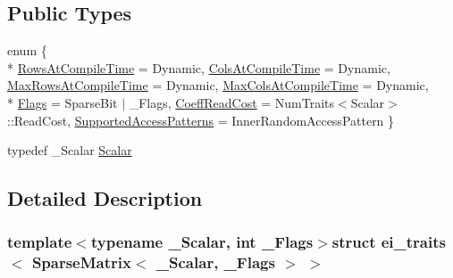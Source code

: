 \subsection*{Public Types}
\begin{DoxyCompactItemize}
\item 
enum \{ \\*
\hyperlink{structei__traits_3_01_sparse_matrix_3_01___scalar_00_01___flags_01_4_01_4_ae805feeaa4898eeaa7b75619a03eb834adb11bc6d779116f1db37ec0078e14438}{Rows\-At\-Compile\-Time} = Dynamic, 
\hyperlink{structei__traits_3_01_sparse_matrix_3_01___scalar_00_01___flags_01_4_01_4_ae805feeaa4898eeaa7b75619a03eb834a5827c0a32ae778a56548d9172a6d791a}{Cols\-At\-Compile\-Time} = Dynamic, 
\hyperlink{structei__traits_3_01_sparse_matrix_3_01___scalar_00_01___flags_01_4_01_4_ae805feeaa4898eeaa7b75619a03eb834a23a6296e7b701a57fd02faff414e0774}{Max\-Rows\-At\-Compile\-Time} = Dynamic, 
\hyperlink{structei__traits_3_01_sparse_matrix_3_01___scalar_00_01___flags_01_4_01_4_ae805feeaa4898eeaa7b75619a03eb834a509b461fd4512caa0453781a075430c2}{Max\-Cols\-At\-Compile\-Time} = Dynamic, 
\\*
\hyperlink{structei__traits_3_01_sparse_matrix_3_01___scalar_00_01___flags_01_4_01_4_ae805feeaa4898eeaa7b75619a03eb834a64315798695114b55142edc538e776e9}{Flags} = Sparse\-Bit $|$ \-\_\-\-Flags, 
\hyperlink{structei__traits_3_01_sparse_matrix_3_01___scalar_00_01___flags_01_4_01_4_ae805feeaa4898eeaa7b75619a03eb834a822149c1c0a742cc58a50ae142be5476}{Coeff\-Read\-Cost} = Num\-Traits$<$Scalar$>$\-:\-:Read\-Cost, 
\hyperlink{structei__traits_3_01_sparse_matrix_3_01___scalar_00_01___flags_01_4_01_4_ae805feeaa4898eeaa7b75619a03eb834adb5060dd7aeeb785d7ba7acbc580040f}{Supported\-Access\-Patterns} = Inner\-Random\-Access\-Pattern
 \}
\item 
typedef \-\_\-\-Scalar \hyperlink{structei__traits_3_01_sparse_matrix_3_01___scalar_00_01___flags_01_4_01_4_ab54b025a0e3fc516465e076dacb0e793}{Scalar}
\end{DoxyCompactItemize}


\subsection{Detailed Description}
\subsubsection*{template$<$typename \-\_\-\-Scalar, int \-\_\-\-Flags$>$struct ei\-\_\-traits$<$ Sparse\-Matrix$<$ \-\_\-\-Scalar, \-\_\-\-Flags $>$ $>$}



